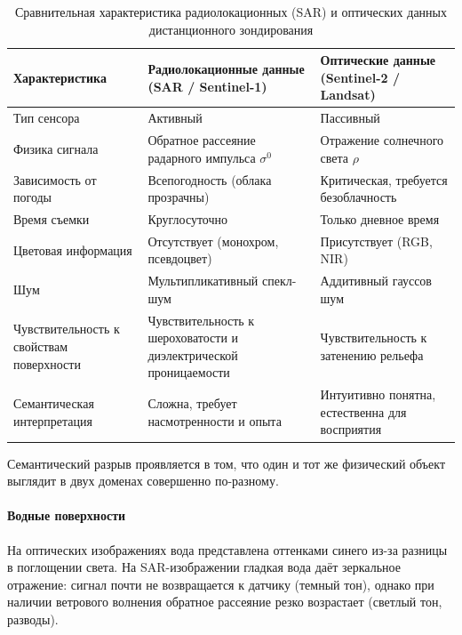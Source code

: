 \begin{table}[!ht]
\centering
\caption{Сравнительная характеристика радиолокационных (SAR) и оптических данных дистанционного зондирования}
\label{tab:sar_vs_optical}
\begin{tabular}{|p{4cm}|p{6cm}|p{5cm}|}
\hline
\textbf{Характеристика} & \textbf{Радиолокационные данные (SAR / Sentinel-1)} & \textbf{Оптические данные (Sentinel-2 / Landsat)} \\
\hline
Тип сенсора & Активный & Пассивный \\
\hline
Физика сигнала & Обратное рассеяние радарного импульса $\sigma^0$ & Отражение солнечного света $\rho$ \\
\hline
Зависимость от погоды & Всепогодность (облака прозрачны) & Критическая, требуется безоблачность \\
\hline
Время съемки & Круглосуточно & Только дневное время \\
\hline
Цветовая информация & Отсутствует (монохром, псевдоцвет) & Присутствует (RGB, NIR) \\
\hline
Шум & Мультипликативный спекл-шум & Аддитивный гауссов шум \\
\hline
Чувствительность к свойствам поверхности & Чувствительность к шероховатости и диэлектрической проницаемости & Чувствительность к затенению рельефа \\
\hline
Семантическая интерпретация & Сложна, требует насмотренности и опыта & Интуитивно понятна, естественна для восприятия \\
\hline
\end{tabular}
\end{table}

Семантический разрыв проявляется в том, что один и тот же физический объект выглядит в двух доменах совершенно по-разному.

\paragraph{Водные поверхности}
На оптических изображениях вода представлена оттенками синего из-за разницы в поглощении света. На SAR-изображении гладкая вода даёт зеркальное отражение: сигнал почти не возвращается к датчику (темный тон), однако при наличии ветрового волнения обратное рассеяние резко возрастает (светлый тон, разводы).

